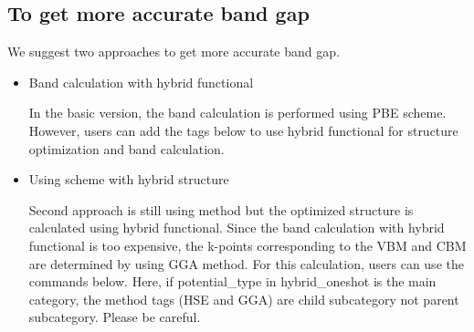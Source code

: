 \documentclass[letterpaper,10pt,english]{sphinxmanual}
\begin{document}
\begin{sphinxVerbatim}[commandchars=\\\{\}]
                           
     
     
               
                   
\end{sphinxVerbatim}


\subsection{To get more accurate band gap}
\label{\detokenize{Input/Advanced_configuration:to-get-more-accurate-band-gap}}
We suggest two approaches to get more accurate band gap.
\begin{itemize}
\item {} 
Band calculation with hybrid functional

In the basic version, the band calculation is performed using PBE scheme.
However, users can add the tags below to use hybrid functional for structure
optimization and band calculation.

\begin{sphinxVerbatim}[commandchars=\\\{\}]
     
     
\end{sphinxVerbatim}

\item {} 
Using  scheme with hybrid structure

Second approach is still using  method but the optimized structure is
calculated using hybrid functional. Since the band calculation with hybrid functional
is too expensive, the k-points corresponding to the VBM and CBM are determined by using
GGA method. For this calculation, users can use the commands below. Here, if potential\_type
in hybrid\_oneshot is the main category, the method tags (HSE and GGA) are child subcategory
not parent subcategory. Please be careful.

\begin{sphinxVerbatim}[commandchars=\\\{\}]
     
     
      
       
\end{sphinxVerbatim}

\end{itemize}
\end{document}
